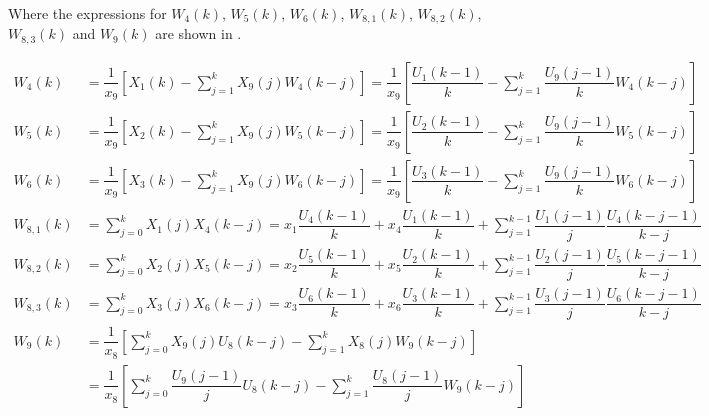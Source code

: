 Where the expressions for $W_{4}\left(k\right)$, $W_{5}\left(k\right)$, $W_{6}\left(k\right)$, $W_{8,1}\left(k\right)$, $W_{8,2}\left(k\right)$, $W_{8,3}\left(k\right)$ and $W_{9}\left(k\right)$ are shown in .

\begin{equation} \label{eq:express_W}
\begin{split}
W_{4}\left(k\right)&=\dfrac{1}{x_{9}}\left[X_{1}\left(k\right)-\displaystyle\sum_{j=1}^{k}X_{9}\left(j\right)W_{4}\left(k-j\right)\right]=\dfrac{1}{x_{9}}\left[\dfrac{U_{1}\left(k-1\right)}{k}-\displaystyle\sum_{j=1}^{k}\dfrac{U_{9}\left(j-1\right)}{k}W_{4}\left(k-j\right)\right]\\
W_{5}\left(k\right)&=\dfrac{1}{x_{9}}\left[X_{2}\left(k\right)-\displaystyle\sum_{j=1}^{k}X_{9}\left(j\right)W_{5}\left(k-j\right)\right]=\dfrac{1}{x_{9}}\left[\dfrac{U_{2}\left(k-1\right)}{k}-\displaystyle\sum_{j=1}^{k}\dfrac{U_{9}\left(j-1\right)}{k}W_{5}\left(k-j\right)\right]\\
W_{6}\left(k\right)&=\dfrac{1}{x_{9}}\left[X_{3}\left(k\right)-\displaystyle\sum_{j=1}^{k}X_{9}\left(j\right)W_{6}\left(k-j\right)\right]=\dfrac{1}{x_{9}}\left[\dfrac{U_{3}\left(k-1\right)}{k}-\displaystyle\sum_{j=1}^{k}\dfrac{U_{9}\left(j-1\right)}{k}W_{6}\left(k-j\right)\right]\\
W_{8,1}\left(k\right)&=\displaystyle\sum_{j=0}^{k}X_{1}\left(j\right)X_{4}\left(k-j\right)=x_{1}\dfrac{U_{4}\left(k-1\right)}{k}+x_{4}\dfrac{U_{1}\left(k-1\right)}{k}+\displaystyle\sum_{j=1}^{k-1}\dfrac{U_{1}\left(j-1\right)}{j}\dfrac{U_{4}\left(k-j-1\right)}{k-j}\\
W_{8,2}\left(k\right)&=\displaystyle\sum_{j=0}^{k}X_{2}\left(j\right)X_{5}\left(k-j\right)=x_{2}\dfrac{U_{5}\left(k-1\right)}{k}+x_{5}\dfrac{U_{2}\left(k-1\right)}{k}+\displaystyle\sum_{j=1}^{k-1}\dfrac{U_{2}\left(j-1\right)}{j}\dfrac{U_{5}\left(k-j-1\right)}{k-j}\\
W_{8,3}\left(k\right)&=\displaystyle\sum_{j=0}^{k}X_{3}\left(j\right)X_{6}\left(k-j\right)=x_{3}\dfrac{U_{6}\left(k-1\right)}{k}+x_{6}\dfrac{U_{3}\left(k-1\right)}{k}+\displaystyle\sum_{j=1}^{k-1}\dfrac{U_{3}\left(j-1\right)}{j}\dfrac{U_{6}\left(k-j-1\right)}{k-j}\\
W_{9}\left(k\right)&=\dfrac{1}{x_{8}}\left[\displaystyle\sum_{j=0}^{k}X_{9}\left(j\right)U_{8}\left(k-j\right)-\displaystyle\sum_{j=1}^{k}X_{8}\left(j\right)W_{9}\left(k-j\right)\right]\\
&=\dfrac{1}{x_{8}}\left[\displaystyle\sum_{j=0}^{k}\dfrac{U_{9}\left(j-1\right)}{j}U_{8}\left(k-j\right)-\displaystyle\sum_{j=1}^{k}\dfrac{U_{8}\left(j-1\right)}{j}W_{9}\left(k-j\right)\right]\\
\end{split}
\end{equation}

